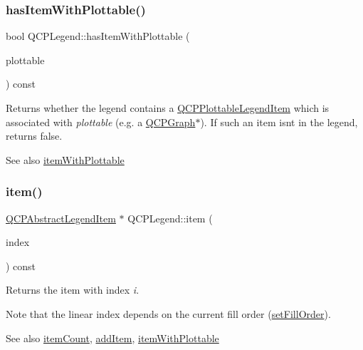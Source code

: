 \subsubsection{\texorpdfstring{has\+Item\+With\+Plottable()}{hasItemWithPlottable()}}
{\footnotesize\ttfamily bool Q\+C\+P\+Legend\+::has\+Item\+With\+Plottable (\begin{DoxyParamCaption}\item[{const \mbox{\hyperlink{class_q_c_p_abstract_plottable}{Q\+C\+P\+Abstract\+Plottable}} $\ast$}]{plottable }\end{DoxyParamCaption}) const}

Returns whether the legend contains a \mbox{\hyperlink{class_q_c_p_plottable_legend_item}{Q\+C\+P\+Plottable\+Legend\+Item}} which is associated with {\itshape plottable} (e.\+g. a \mbox{\hyperlink{class_q_c_p_graph}{Q\+C\+P\+Graph}}$\ast$). If such an item isn\textquotesingle{}t in the legend, returns false.

\begin{DoxySeeAlso}{See also}
\mbox{\hyperlink{class_q_c_p_legend_a91e790002d8bf15a20628a8e8841e397}{item\+With\+Plottable}} 
\end{DoxySeeAlso}
\mbox{\label{class_q_c_p_legend_acfe9694c45104a3359d3806ed366fcf7}} 
\subsubsection{\texorpdfstring{item()}{item()}}
{\footnotesize\ttfamily \mbox{\hyperlink{class_q_c_p_abstract_legend_item}{Q\+C\+P\+Abstract\+Legend\+Item}} $\ast$ Q\+C\+P\+Legend\+::item (\begin{DoxyParamCaption}\item[{int}]{index }\end{DoxyParamCaption}) const}

Returns the item with index {\itshape i}.

Note that the linear index depends on the current fill order (\mbox{\hyperlink{class_q_c_p_layout_grid_affc2f3cfd22f28698c5b29b960d2a391}{set\+Fill\+Order}}).

\begin{DoxySeeAlso}{See also}
\mbox{\hyperlink{class_q_c_p_legend_a57ab86ab8b2a3762d4c1455eb5452c88}{item\+Count}}, \mbox{\hyperlink{class_q_c_p_legend_a3ab274de52d2951faea45a6d975e6b3f}{add\+Item}}, \mbox{\hyperlink{class_q_c_p_legend_a91e790002d8bf15a20628a8e8841e397}{item\+With\+Plottable}} 
\end{DoxySeeAlso}
\mbox{\label{class_q_c_p_legend_a57ab86ab8b2a3762d4c1455eb5452c88}} 
